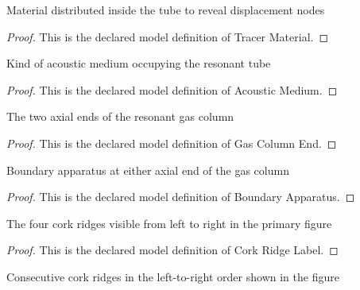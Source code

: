 \begin{definition}
  \label{def:physics:phyx-mini-0328:phyxminiproblems-problemphyxmini0328-tracermaterial}
  Material distributed inside the tube to reveal displacement nodes
\end{definition}
\begin{proof}
  This is the declared model definition of Tracer Material.
\end{proof}
\begin{definition}
  \label{def:physics:phyx-mini-0328:phyxminiproblems-problemphyxmini0328-acousticmedium}
  Kind of acoustic medium occupying the resonant tube
\end{definition}
\begin{proof}
  This is the declared model definition of Acoustic Medium.
\end{proof}
\begin{definition}
  \label{def:physics:phyx-mini-0328:phyxminiproblems-problemphyxmini0328-gascolumnend}
  The two axial ends of the resonant gas column
\end{definition}
\begin{proof}
  This is the declared model definition of Gas Column End.
\end{proof}
\begin{definition}
  \label{def:physics:phyx-mini-0328:phyxminiproblems-problemphyxmini0328-boundaryapparatus}
  Boundary apparatus at either axial end of the gas column
\end{definition}
\begin{proof}
  This is the declared model definition of Boundary Apparatus.
\end{proof}
\begin{definition}
  \label{def:physics:phyx-mini-0328:phyxminiproblems-problemphyxmini0328-corkridgelabel}
  The four cork ridges visible from left to right in the primary figure
\end{definition}
\begin{proof}
  This is the declared model definition of Cork Ridge Label.
\end{proof}
\begin{definition}
  \label{def:physics:phyx-mini-0328:phyxminiproblems-problemphyxmini0328-adjacentcorkridges}
  Consecutive cork ridges in the left-to-right order shown in the figure
\end{definition}
